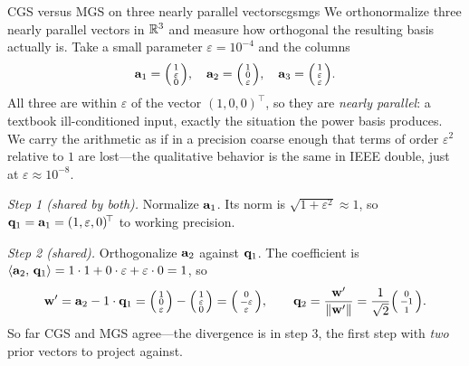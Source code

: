 \begin{workedexample}{CGS versus MGS on three nearly parallel vectors}{cgsmgs}
We orthonormalize three nearly parallel vectors in $\mathbb{R}^3$ and measure how
orthogonal the resulting basis actually is. Take a small parameter
$\varepsilon = 10^{-4}$ and the columns
\[
  \mathbf{a}_1 = \begin{psmallmatrix} 1 \\ \varepsilon \\ 0 \end{psmallmatrix},\quad
  \mathbf{a}_2 = \begin{psmallmatrix} 1 \\ 0 \\ \varepsilon \end{psmallmatrix},\quad
  \mathbf{a}_3 = \begin{psmallmatrix} 1 \\ \varepsilon \\ \varepsilon \end{psmallmatrix}.
\]
All three are within $\varepsilon$ of the vector $(1,0,0)^{\!\top}$, so they are
\emph{nearly parallel}: a textbook ill-conditioned input, exactly the situation the
power basis produces. We carry the arithmetic as if in a precision coarse enough
that terms of order $\varepsilon^2$ relative to $1$ are lost---the qualitative
behavior is the same in IEEE double, just at $\varepsilon \approx 10^{-8}$.

\smallskip
\emph{Step 1 (shared by both).} Normalize $\mathbf{a}_1$. Its norm is
$\sqrt{1 + \varepsilon^2} \approx 1$, so $\mathbf{q}_1 = \mathbf{a}_1 = (1, \varepsilon, 0)^{\!\top}$
to working precision.

\smallskip
\emph{Step 2 (shared).} Orthogonalize $\mathbf{a}_2$ against $\mathbf{q}_1$. The coefficient is
$\left\langle \mathbf{a}_2,\, \mathbf{q}_1\right\rangle = 1\cdot 1 + 0\cdot\varepsilon + \varepsilon\cdot 0 = 1$, so
\[
  \mathbf{w}' = \mathbf{a}_2 - 1\cdot\mathbf{q}_1
       = \begin{psmallmatrix}1\\0\\\varepsilon\end{psmallmatrix}
       - \begin{psmallmatrix}1\\\varepsilon\\0\end{psmallmatrix}
       = \begin{psmallmatrix}0\\-\varepsilon\\\varepsilon\end{psmallmatrix},
  \qquad
  \mathbf{q}_2 = \frac{\mathbf{w}'}{\lVert\mathbf{w}'\rVert}
        = \frac{1}{\sqrt2}\begin{psmallmatrix}0\\-1\\1\end{psmallmatrix}.
\]
So far CGS and MGS agree---the divergence is in step 3, the first step with
\emph{two} prior vectors to project against.


\end{workedexample}
